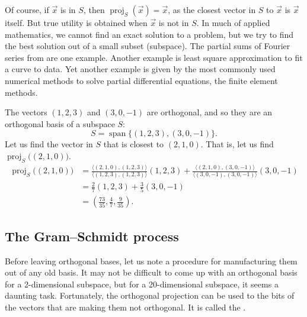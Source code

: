 Of course, if $\vec{x}$ is in $S$, then $\operatorname{proj}_{S}(\vec{x}) =
\vec{x}$, as the closest vector in $S$ to $\vec{x}$ is $\vec{x}$ itself.
But true utility is obtained when $\vec{x}$ is not in $S$.
In much of applied mathematics, we cannot find an exact solution to a problem,
but we try
to find the best solution out of a small subset (subspace).  The partial sums of
Fourier series from  are one example.  Another
example is least square approximation to fit a curve to data.  Yet another
example is given by
the most commonly used numerical methods to solve partial differential
equations, the finite element methods.

\begin{example}
The vectors $(1,2,3)$ and $(3,0,-1)$ are orthogonal, and so they are
an orthogonal basis of a subspace $S$:
\begin{equation*}
S = 
\operatorname{span} \bigl\{ (1,2,3), (3,0,-1) \bigr\} .
\end{equation*}
Let us find the vector in $S$ that is closest to $(2,1,0)$.  That is,
let us find $\operatorname{proj}_{S}\bigl((2,1,0)\bigr)$.
\begin{equation*}
\begin{split}
\operatorname{proj}_{S}\bigl((2,1,0)\bigr)
& =
\frac{\langle (2,1,0), (1,2,3) \rangle}{
\langle (1,2,3), (1,2,3) \rangle
}
(1,2,3)
+
\frac{\langle (2,1,0), (3,0,-1) \rangle}{
\langle (3,0,-1), (3,0,-1) \rangle
}
(3,0,-1)
\\
& =
\frac{2}{7}
(1,2,3)
+
\frac{3}{5}
(3,0,-1)
\\
&=
\left( \frac{73}{35} , \frac{4}{7} , \frac{9}{35} \right) .
\end{split}
\end{equation*}
\end{example}

\subsection{The Gram--Schmidt process}

Before leaving orthogonal bases, let us note a procedure for manufacturing
them out of any old basis.  It may not be difficult to come up with an
orthogonal basis for a 2-dimensional subspace, but for a 20-dimensional subspace,
it seems a daunting task.  Fortunately, the orthogonal projection can be
used to  the bits of the vectors that are making them
not orthogonal.  It is called the \emph{}.

